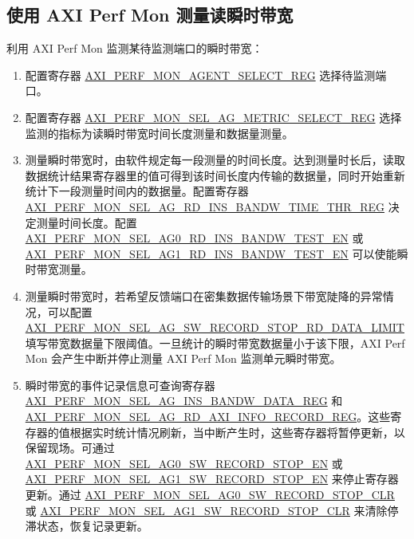 \documentclass[main\_\_CN.tex]{subfiles}
\begin{document}
\subsection{使用 AXI Perf Mon 测量读瞬时带宽}
利用 AXI Perf Mon 监测某待监测端口的瞬时带宽：
\begin{enumerate}
    \item 配置寄存器 \hyperref[regdesc:AXIPERFMONAGENTSELECTREG]{AXI\_PERF\_MON\_AGENT\_SELECT\_REG} 选择待监测端口。
    \item 配置寄存器 \hyperref[regdesc:AXIPERFMONSELAGNMETRICSELECTMREG]{AXI\_PERF\_MON\_SEL\_AG\_METRIC\_SELECT\_REG} 选择监测的指标为读瞬时带宽时间长度测量和数据量测量。
    \item 测量瞬时带宽时，由软件规定每一段测量的时间长度。达到测量时长后，读取数据统计结果寄存器里的值可得到该时间长度内传输的数据量，同时开始重新统计下一段测量时间内的数据量。配置寄存器 \hyperref[regdesc:AXIPERFMONSELAGNINSBANDWTIMETHRREG]{AXI\_PERF\_MON\_SEL\_AG\_RD\_INS\_BANDW\_TIME\_THR\_REG} 决定测量时间长度。配置 \hyperref[fielddesc:AXIPERFMONSELAG0RDINSBANDWTESTEN]{AXI\_PERF\_MON\_SEL\_AG0\_RD\_INS\_BANDW\_TEST\_EN} 或 \hyperref[fielddesc:AXIPERFMONSELAG1RDINSBANDWTESTEN]{AXI\_PERF\_MON\_SEL\_AG1\_RD\_INS\_BANDW\_TEST\_EN} 可以使能瞬时带宽测量。
    \item 测量瞬时带宽时，若希望反馈端口在密集数据传输场景下带宽陡降的异常情况，可以配置 \hyperref[fielddesc:AXIPERFMONSELAGNSWRECORDSTOPRDDATALIMIT]{AXI\_PERF\_MON\_SEL\_AG\_SW\_RECORD\_STOP\_RD\_DATA\_LIMIT} 填写带宽数据量下限阈值。一旦统计的瞬时带宽数据量小于该下限，AXI Perf Mon 会产生中断并停止测量 AXI Perf Mon 监测单元瞬时带宽。
    \item 瞬时带宽的事件记录信息可查询寄存器 \hyperref[regdesc:AXIPERFMONSELAGNINSBANDWDATAMREG]{AXI\_PERF\_MON\_SEL\_AG\_INS\_BANDW\_DATA\_REG} 和 \hyperref[regdesc:AXIPERFMONSELAGNRDAXIINFORECORDMREG]{AXI\_PERF\_MON\_SEL\_AG\_RD\_AXI\_INFO\_RECORD\_REG}。这些寄存器的值根据实时统计情况刷新，当中断产生时，这些寄存器将暂停更新，以保留现场。可通过 \hyperref[fielddesc:AXIPERFMONSELAG0SWRECORDSTOPEN]{AXI\_PERF\_MON\_SEL\_AG0\_SW\_RECORD\_STOP\_EN} 或 \hyperref[fielddesc:AXIPERFMONSELAG1SWRECORDSTOPEN]{AXI\_PERF\_MON\_SEL\_AG1\_SW\_RECORD\_STOP\_EN} 来停止寄存器更新。通过 \hyperref[fielddesc:AXIPERFMONSELAG0SWRECORDSTOPCLR]{AXI\_PERF\_MON\_SEL\_AG0\_SW\_RECORD\_STOP\_CLR} 或 \hyperref[fielddesc:AXIPERFMONSELAG1SWRECORDSTOPCLR]{AXI\_PERF\_MON\_SEL\_AG1\_SW\_RECORD\_STOP\_CLR} 来清除停滞状态，恢复记录更新。

\end{enumerate}
\end{document}
